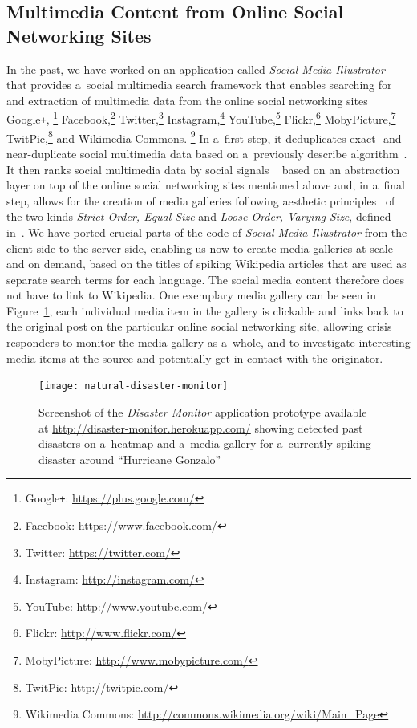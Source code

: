 \documentclass[letterpaper]{article}
\begin{document}
\subsection{Multimedia Content from Online Social Networking Sites}

In the past, we have worked on an application called
\emph{Social Media Illustrator}~\cite{steiner2014thesis}
that provides a~social multimedia search framework
that enables searching for and extraction of
multimedia data from the online social networking sites
Google\texttt{+},%
\footnote{Google\texttt{+}: \url{https://plus.google.com/}}
Facebook,\footnote{Facebook: \url{https://www.facebook.com/}}
Twitter,\footnote{Twitter: \url{https://twitter.com/}}
Instagram,\footnote{Instagram: \url{http://instagram.com/}}
YouTube,\footnote{YouTube: \url{http://www.youtube.com/}}
Flickr,\footnote{Flickr: \url{http://www.flickr.com/}}
MobyPicture,\footnote{MobyPicture: \url{http://www.mobypicture.com/}}
TwitPic,\footnote{TwitPic: \url{http://twitpic.com/}}
and Wikimedia Commons.%
\footnote{Wikimedia Commons: \url{http://commons.wikimedia.org/wiki/Main_Page}}
In a~first step, it deduplicates exact- and near-duplicate
social multimedia data based on a~previously describe algorithm~\cite{steiner2013clustering}.
It then ranks social multimedia data by social signals%
~\cite{steiner2014thesis} based on an abstraction layer
on top of the online social networking sites mentioned above
and, in a~final step, allows for the creation of media galleries
following aesthetic principles~\cite{steiner2014thesis}
of the two kinds \emph{Strict Order, Equal Size}
and \emph{Loose Order, Varying Size},
defined in~\cite{steiner2014thesis}.
We have ported crucial parts
of the code of \emph{Social Media Illustrator}
from the client-side to the server-side,
enabling us now to create media galleries at scale and on demand,
based on the titles of spiking Wikipedia articles
that are used as separate search terms for each language.
The social media content therefore does not have to link to Wikipedia.
One exemplary media gallery can be seen in Figure~\ref{fig:screenshot},
each individual media item in the gallery is clickable
and links back to the original post
on the particular online social networking site,
allowing crisis responders to monitor the media gallery as a~whole,
and to investigate interesting media items at the source
and potentially get in contact with the originator.

\begin{figure}[b!]
  \centering
  \texttt{[image: natural-disaster-monitor]}
  \caption{Screenshot of the \emph{Disaster Monitor} application
    prototype available at \url{http://disaster-monitor.herokuapp.com/}
    showing detected past disasters on a~heatmap and a~media gallery for
    a~currently spiking disaster around ``Hurricane Gonzalo''}
  \label{fig:screenshot}
\end{figure}
\end{document}
